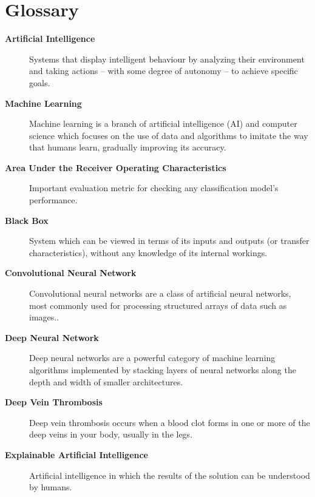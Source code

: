 \chapter*{Glossary}
\begin{description}
    \item [\textbf{Artificial Intelligence}] Systems that display intelligent behaviour by analyzing their environment and taking actions – with some degree of autonomy – to achieve specific goals.
    \item [\textbf{Machine Learning}] Machine learning is a branch of artificial intelligence (AI) and computer science which focuses on the use of data and algorithms to imitate the way that humans learn, gradually improving its accuracy.
    \item [\textbf{Area Under the Receiver Operating Characteristics}] Important evaluation metric for checking any classification model’s performance.
    \item [\textbf{Black Box}] System which can be viewed in terms of its inputs and outputs (or transfer characteristics), without any knowledge of its internal workings.
    \item [\textbf{Convolutional Neural Network}] Convolutional neural networks are a class of artificial neural networks, most commonly used for processing structured arrays of data such as images..
    \item [\textbf{Deep Neural Network}] Deep neural networks are a powerful category of machine learning algorithms implemented by stacking layers of neural networks along the depth and width of smaller architectures.
    \item [\textbf{Deep Vein Thrombosis}] Deep vein thrombosis occurs when a blood clot forms in one or more of the deep veins in your body, usually in the legs.
    \item [\textbf{Explainable Artificial Intelligence}] Artificial intelligence in which the results of the solution can be understood by humans.
\end{description}
\clearpage

{}
